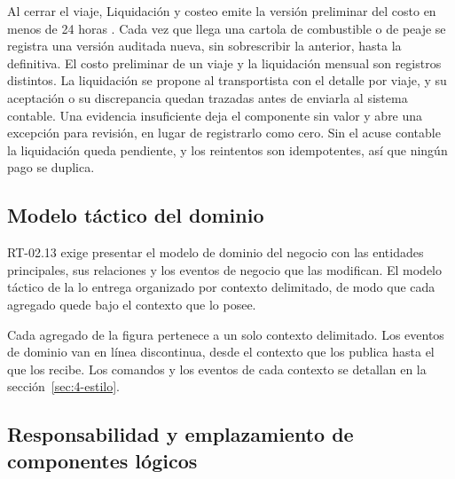 
Al cerrar el viaje, Liquidación y costeo emite la versión preliminar del costo en menos de 24 horas
. Cada vez que llega una cartola de combustible o de peaje se registra una versión
auditada nueva, sin sobrescribir la anterior, hasta la definitiva. El costo preliminar de un viaje y la
liquidación mensual son registros distintos. La liquidación se propone al transportista con el detalle
por viaje, y su aceptación o su discrepancia quedan trazadas antes de enviarla al sistema contable. Una
evidencia insuficiente deja el componente sin valor y abre una excepción para revisión, en lugar de
registrarlo como cero. Sin el acuse contable la liquidación queda pendiente, y los reintentos son
idempotentes, así que ningún pago se duplica.

\subsection{Modelo táctico del dominio}\label{sec:4-tactico}

RT-02.13 exige presentar el modelo de dominio del negocio con las entidades principales, sus relaciones
y los eventos de negocio que las modifican. El modelo táctico de la  lo entrega
organizado por contexto delimitado, de modo que cada agregado quede bajo el contexto que lo posee.


Cada agregado de la figura pertenece a un solo contexto delimitado. Los eventos de dominio van en línea
discontinua, desde el contexto que los publica hasta el que los recibe. Los comandos y los eventos de
cada contexto se detallan en la sección~\ref{sec:4-estilo}.

\subsection{Responsabilidad y emplazamiento de componentes lógicos}\label{sec:4-inventario}

